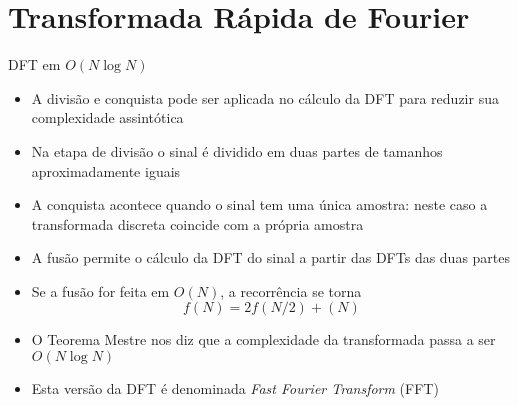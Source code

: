 \section{Transformada Rápida de Fourier}

\begin{frame}[fragile]{DFT em $O(N\log N)$}

    \begin{itemize}
        \item A divisão e conquista pode ser aplicada no cálculo da DFT para reduzir sua
            complexidade assintótica

        \item Na etapa de divisão o sinal é dividido em duas partes de tamanhos aproximadamente
            iguais

        \item A conquista acontece quando o sinal tem uma única amostra: neste caso a transformada
            discreta coincide com a própria amostra

        \item A fusão permite o cálculo da DFT do sinal a partir das DFTs das duas partes

        \item Se a fusão for feita em $O(N)$, a recorrência se torna
        \[
            f(N) = 2f(N/2) + (N)
        \]

        \item O Teorema Mestre nos diz que a complexidade da transformada passa a ser $O(N\log N)$

        \item Esta versão da DFT é denominada \textit{Fast Fourier Transform} (FFT)
    \end{itemize}

\end{frame}

